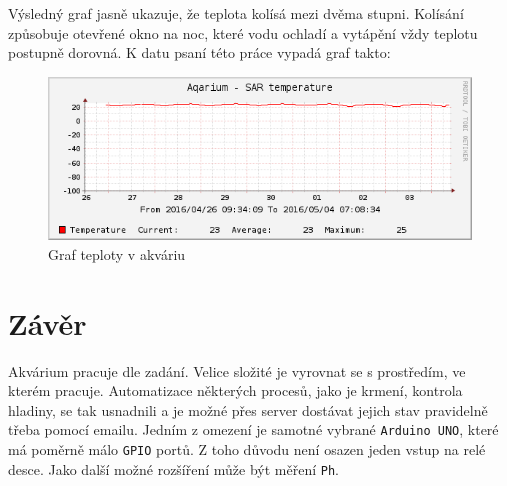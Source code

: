 \documentclass[a4paper,10pt]{article}
\newcommand{\ttt}[1]{\texttt{#1}}
\begin{document}
Výsledný graf jasně ukazuje, že teplota kolísá mezi dvěma stupni. Kolísání způsobuje otevřené okno na noc, které vodu ochladí a vytápění vždy teplotu postupně dorovná. K datu psaní této práce vypadá graf takto:

\begin{figure}[H]
  \centering
    \includegraphics[width=1\textwidth]{graph.png}
  \caption{Graf teploty v akváriu}
  \label{char:temps}
\end{figure}


\section{Závěr}

Akvárium pracuje dle zadání. Velice složité je vyrovnat se s prostředím, ve kterém pracuje. Automatizace některých procesů, jako je krmení, kontrola hladiny, se tak usnadnili a je možné přes server dostávat jejich stav pravidelně třeba pomocí emailu. Jedním z omezení je samotné vybrané \ttt{Arduino UNO}, které má poměrně málo \ttt{GPIO} portů. Z toho důvodu není osazen jeden vstup na relé desce. Jako další možné rozšíření může být měření \ttt{Ph}.



\end{document}
